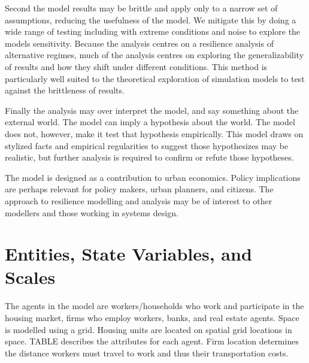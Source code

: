 Second the model results may be brittle and apply only to a narrow set of assumptions, reducing the usefulness of the model. We mitigate this by doing a wide range of testing including with extreme conditions and noise to explore the models sensitivity. Because the analysis centres on a resilience analysis of alternative regimes, much of the analysis centres on exploring the generalizability of results and how they shift under different conditions. This method is particularly well suited to the theoretical exploration of simulation models to test against the brittleness of results. %

Finally the analysis may over interpret the model, and say something about the external world. The model can imply a hypothesis about the world. The model does not, however, make it test that hypothesis empirically. This model draws on stylized facts and empirical regularities to suggest those hypothesizes may be realistic, but further analysis is required to confirm or refute those hypotheses. 


The model is designed as a contribution to urban economics.
Policy implications are perhaps relevant for policy makers, urban planners, and citizens.
The approach to resilience modelling and analysis may be of interest to other modellers and those working in systems design. 


\section*{Entities, State Variables, and Scales}

The agents in the model are workers/households who work and participate in the housing market, firms who employ workers, banks, and real estate agents. Space is modelled using a grid. Housing units are located on spatial grid locations in space. TABLE describes the attributes for each agent. Firm location determines the distance workers must travel to work and thus their transportation costs.

